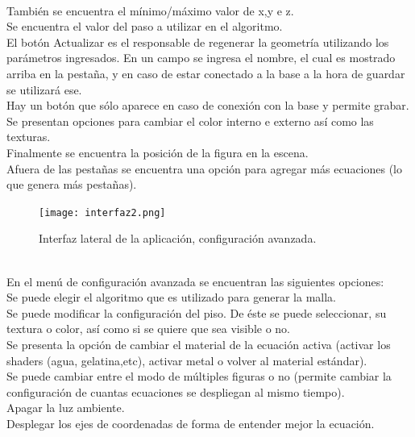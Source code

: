 \documentclass[12pt]{article}
\begin{document}
\\También se encuentra el mínimo/máximo valor de x,y e z.
\\Se encuentra el valor del paso a utilizar en el algoritmo.
\\El botón Actualizar es el responsable de regenerar la geometría utilizando los parámetros ingresados.
\clearpage
En un campo se ingresa el nombre, el cual es mostrado arriba en la pestaña, y en caso de estar conectado a la base a la hora de guardar se utilizará ese.
\\Hay un botón que sólo aparece en caso de conexión con la base y permite grabar.
\\Se presentan opciones para cambiar el color interno e externo así como las texturas.
\\Finalmente se encuentra la posición de la figura en la escena.
\\Afuera de las pestañas se encuentra una opción para agregar más ecuaciones (lo que genera más pestañas). \\
\begin{figure}
\texttt{[image: interfaz2.png]} 
\caption{Interfaz lateral de la aplicación, configuración avanzada.}
\label{fig:subim1}
\end{figure}
\\En el menú de configuración avanzada se encuentran las siguientes opciones:
\\Se puede elegir el algoritmo que es utilizado para generar la malla.
\\Se puede modificar la configuración del piso. De éste se puede seleccionar, su textura o color, así como si se quiere que sea visible o no.
\\Se presenta la opción de cambiar el material de la ecuación activa (activar los shaders (agua, gelatina,etc), activar metal o volver al material estándar).
\\Se puede cambiar entre el modo de múltiples figuras o no (permite cambiar la configuración de cuantas ecuaciones se despliegan al mismo tiempo).
\\Apagar la luz ambiente.
\\Desplegar los ejes de coordenadas de forma de entender mejor la ecuación.
\\\\\\\\\\\\\\\\\\\\
\end{document}

